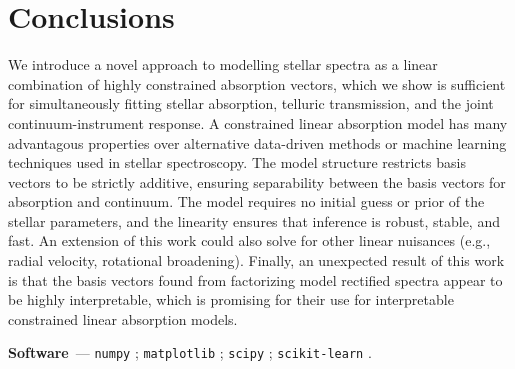 \documentclass[modern]{aastex631}
\renewcommand{\paragraph}[1]{\medskip\par\noindent\textbf{#1}~---}
\begin{document}
\section{Conclusions} \label{sec:conclusions}

We introduce a novel approach to modelling stellar spectra as a linear combination of highly constrained absorption vectors, which we show is sufficient for simultaneously fitting stellar absorption, telluric transmission, and the joint continuum-instrument response. A constrained linear absorption model has many advantagous properties over alternative data-driven methods or machine learning techniques used in stellar spectroscopy. The model structure restricts basis vectors to be strictly additive, ensuring separability between the basis vectors for absorption and continuum. The model requires no initial guess or prior of the stellar parameters, and the linearity ensures that inference is robust, stable, and fast. An extension of this work could also solve for other linear nuisances (e.g., radial velocity, rotational broadening). Finally, an unexpected result of this work is that the basis vectors found from factorizing model rectified spectra appear to be highly interpretable, which is promising for their use for interpretable constrained linear absorption models.\\





\paragraph{Software}
\texttt{numpy} \citep{numpy}; 
\texttt{matplotlib} \citep{matplotlib}; 
\texttt{scipy} \citep{scipy};
\texttt{scikit-learn} \citep{scikit_learn}.
\end{document}
